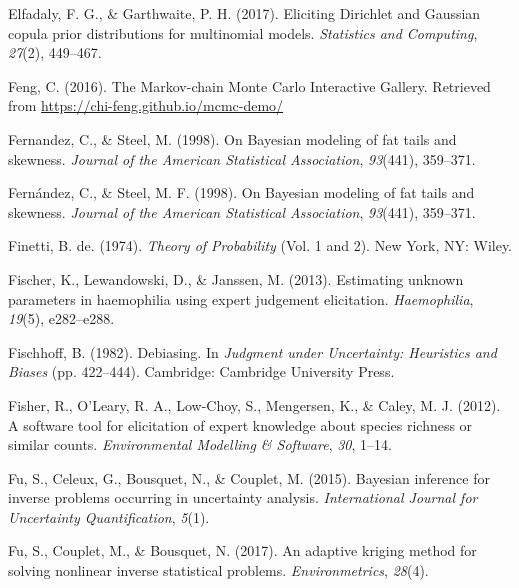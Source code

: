 \documentclass[openright,titlepage,12pt,a4paper]{book}
\begin{document}
\leavevmode\hypertarget{ref-elfadaly_eliciting_2017}{}%
Elfadaly, F. G., \& Garthwaite, P. H. (2017). Eliciting Dirichlet and Gaussian copula prior distributions for multinomial models. \emph{Statistics and Computing}, \emph{27}(2), 449--467.

\leavevmode\hypertarget{ref-feng_markov-chain_2016}{}%
Feng, C. (2016). The Markov-chain Monte Carlo Interactive Gallery. Retrieved from \url{https://chi-feng.github.io/mcmc-demo/}

\leavevmode\hypertarget{ref-fernandez_bayesian_1998-1}{}%
Fernandez, C., \& Steel, M. (1998). On Bayesian modeling of fat tails and skewness. \emph{Journal of the American Statistical Association}, \emph{93}(441), 359--371.

\leavevmode\hypertarget{ref-fernandez_bayesian_1998}{}%
Fernández, C., \& Steel, M. F. (1998). On Bayesian modeling of fat tails and skewness. \emph{Journal of the American Statistical Association}, \emph{93}(441), 359--371.

\leavevmode\hypertarget{ref-de_finetti_theory_1974}{}%
Finetti, B. de. (1974). \emph{Theory of Probability} (Vol. 1 and 2). New York, NY: Wiley.

\leavevmode\hypertarget{ref-fischer_estimating_2013}{}%
Fischer, K., Lewandowski, D., \& Janssen, M. (2013). Estimating unknown parameters in haemophilia using expert judgement elicitation. \emph{Haemophilia}, \emph{19}(5), e282--e288.

\leavevmode\hypertarget{ref-fischhoff_debiasing_1982}{}%
Fischhoff, B. (1982). Debiasing. In \emph{Judgment under Uncertainty: Heuristics and Biases} (pp. 422--444). Cambridge: Cambridge University Press.

\leavevmode\hypertarget{ref-fisher_software_2012}{}%
Fisher, R., O'Leary, R. A., Low-Choy, S., Mengersen, K., \& Caley, M. J. (2012). A software tool for elicitation of expert knowledge about species richness or similar counts. \emph{Environmental Modelling \& Software}, \emph{30}, 1--14.

\leavevmode\hypertarget{ref-fu_bayesian_2015}{}%
Fu, S., Celeux, G., Bousquet, N., \& Couplet, M. (2015). Bayesian inference for inverse problems occurring in uncertainty analysis. \emph{International Journal for Uncertainty Quantification}, \emph{5}(1).

\leavevmode\hypertarget{ref-fu_adaptive_2017}{}%
Fu, S., Couplet, M., \& Bousquet, N. (2017). An adaptive kriging method for solving nonlinear inverse statistical problems. \emph{Environmetrics}, \emph{28}(4).
\end{document}

